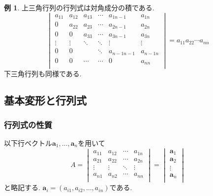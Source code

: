 \documentclass[dvipdfmx,a4paper,11pt]{article} %
\theoremstyle{definition}
\newtheorem{exa}[thm]{例}
\begin{document}
\begin{exa}\cite[例 3.1.13]{O}
上三角行列の行列式は対角成分の積である.
$$
\begin{vmatrix}
a_{11}& a_{12} & a_{13} &\cdots &a_{1n-1}&a_{1n} \\
0 	   & a_{22} & a_{23} &\cdots&a_{2n-1} &a_{2n} \\
0 	   & 0  		& a_{33} &\cdots &a_{3n-1}&a_{3n} \\
\vdots& \vdots	&  \ddots &\ddots&	\vdots  &	\vdots \\
0	& 0      		&      	&\ddots	&a_{n-1n-1} &a_{n-1n} \\
0	& 0      		&     \cdots	&	\cdots&0		&a_{nn} \\
\end{vmatrix}
=a_{11}a_{22}\cdots a_{nn}
$$
下三角行列も同様である. 
\end{exa}

\subsection{基本変形と行列式 \cite[3.2節]{O}}
\subsubsection{行列式の性質}

以下行ベクトル$\bm{a}_1,\ldots, \bm{a}_n$を用いて
$$
A
=
\begin{vmatrix}
a_{11}& a_{12} & \cdots &a_{1n} \\
a_{21}& a_{22} & \cdots &a_{2n} \\
\vdots& \vdots	&	\ddots   &	\vdots \\
a_{n1}& a_{n2} & \cdots &a_{nn} \\
\end{vmatrix}
=
\begin{vmatrix}
\bm{a}_1 \\
\bm{a}_2 \\
\vdots \\
\bm{a}_n\\
\end{vmatrix}
$$
と略記する. 
$\bm{a}_i = (a_{i1}, a_{i2}, \ldots, a_{in})$である. 
\end{document}
